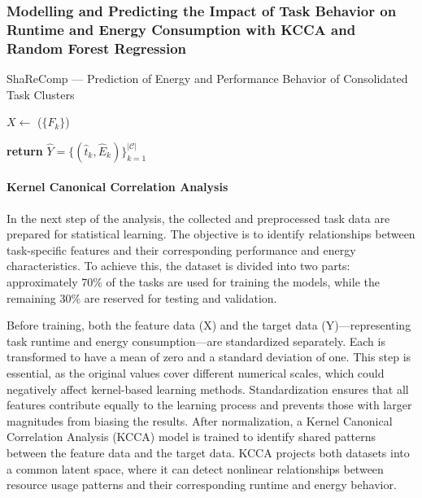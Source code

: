 \subsubsection{Modelling and Predicting the Impact of Task Behavior on Runtime and Energy Consumption with KCCA and Random Forest Regression}
\label{sec:prediciton_kcca_rfr}

\begin{algorithm}[H]
    \caption{ShaReComp — Prediction of Energy and Performance Behavior of Consolidated Task Clusters}
    \label{alg:sharecomp_prediction}


    \BlankLine
    $X \gets$ \Build($\{F_k\}$) 

    \BlankLine
    \BlankLine
    \textbf{return } $\hat{Y} = \{ (\hat{t}_k, \hat{E}_k) \}_{k=1}^{|\mathcal{C}|}$
\end{algorithm}

\paragraph{Kernel Canonical Correlation Analysis}
In the next step of the analysis, the collected and preprocessed task data are prepared for statistical learning. The objective is to identify relationships between task-specific features and their corresponding performance and energy characteristics. To achieve this, the dataset is divided into two parts: approximately 70\% of the tasks are used for training the models, while the remaining 30\% are reserved for testing and validation.

Before training, both the feature data (X) and the target data (Y)—representing task runtime and energy consumption—are standardized separately. Each is transformed to have a mean of zero and a standard deviation of one. This step is essential, as the original values cover different numerical scales, which could negatively affect kernel-based learning methods. Standardization ensures that all features contribute equally to the learning process and prevents those with larger magnitudes from biasing the results.
After normalization, a Kernel Canonical Correlation Analysis (KCCA) model is trained to identify shared patterns between the feature data and the target data. KCCA projects both datasets into a common latent space, where it can detect nonlinear relationships between resource usage patterns and their corresponding runtime and energy behavior.

